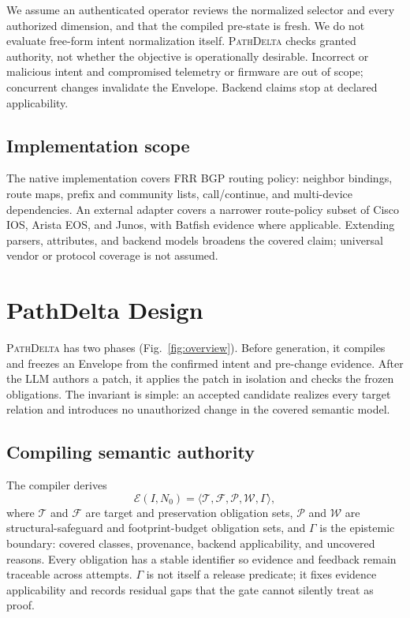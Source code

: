\documentclass[conference]{IEEEtran}
\newcommand{\system}{\textsc{PathDelta}\xspace}
\newcommand{\env}{\mathcal{E}}
\newcommand{\target}{\mathcal{T}}
\newcommand{\semframe}{\mathcal{F}}
\newcommand{\deps}{\mathcal{P}}
\newcommand{\budget}{\mathcal{W}}
\begin{document}
We assume an authenticated operator reviews the normalized selector and every
authorized dimension, and that the compiled pre-state is fresh.  We do not
evaluate free-form intent normalization itself.  \system checks granted
authority, not whether the objective is operationally desirable.  Incorrect or
malicious intent and compromised telemetry or firmware are out of scope;
concurrent changes invalidate the Envelope.  Backend claims stop at declared
applicability.

\subsection{Implementation scope}

The native implementation covers FRR BGP routing policy: neighbor bindings,
route maps, prefix and community lists, call/continue, and multi-device
dependencies.  An external adapter covers a narrower route-policy subset of
Cisco IOS, Arista EOS, and Junos, with Batfish evidence where applicable.
Extending parsers, attributes, and backend models broadens the covered claim;
universal vendor or protocol coverage is not assumed.

\section{PathDelta Design}

\system has two phases (Fig.~\ref{fig:overview}).  Before generation, it compiles
and freezes an Envelope from the confirmed intent and pre-change evidence.
After the LLM authors a patch, it applies the patch in isolation and checks the
frozen obligations.  The invariant is simple: an accepted candidate realizes
every target relation and introduces no unauthorized change in the covered
semantic model.

\subsection{Compiling semantic authority}

The compiler derives
\begin{equation*}
  \env(I,N_0)=\langle \target,\semframe,\deps,\budget,\Gamma\rangle,
\end{equation*}
where $\target$ and $\semframe$ are target and preservation obligation sets,
$\deps$ and $\budget$ are structural-safeguard and footprint-budget obligation
sets, and $\Gamma$ is the epistemic
boundary: covered classes, provenance, backend applicability, and uncovered
reasons.  Every obligation has a stable identifier so evidence and feedback
remain traceable across attempts.  $\Gamma$ is not itself a release predicate;
it fixes evidence applicability and records residual gaps that the gate cannot
silently treat as proof.
\end{document}
